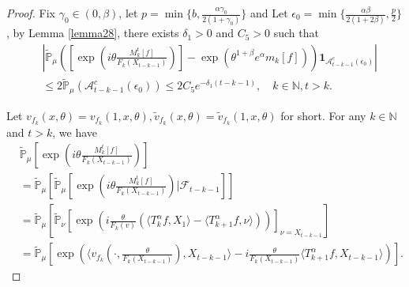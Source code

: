 \documentclass[12pt,oneside,english]{amsart}
\theoremstyle{plain}
\theoremstyle{definition}
\numberwithin{equation}{section}
\begin{document}
\begin{proof}
Fix $\gamma_0\in (0,\beta)$, let $p=\min\{b,\frac{\alpha\gamma_0}{2(1+\gamma_0)}\}$ and Let $\epsilon_0=\min\{\frac{\alpha\beta}{2(1+2\beta)},\frac{p}{2}\}$, by Lemma \ref{lemma28}, there exists $\delta_1>0$ and $C_5>0$ such that 
    \begin{align}
    \label{eq:31step0}
        &\left|\mathbb{\tilde{P}}_{\mu}\left([\exp(i\theta \frac {M_k^t[f]}{F_k(X_{t-k-1})})]-\exp(\theta^{1+\beta}e^{\alpha}m_k[f])\right)\mathbf{1}_{\mathcal{A}^c_{t-k-1}(\epsilon_0)}\right|
        \\ &\leq 2\mathbb{\tilde{P}}_{\mu}(\mathcal{A}^c_{t-k-1}(\epsilon_0))
        \leq 2C_5e^{-\delta_1(t-k-1)},\quad k\in \mathbb{N}, t>k.\label{lemma33q}
    \end{align}
    

    Let $v_{f_k}(x,\theta)=v_{f_k}(1,x,\theta),\tilde{v}_{f_k}(x,\theta)=\tilde{v}_{f_k}(1,x,\theta)$ for short. For any $k\in\mathbb{N}$ and $t>k$, we have
    \begin{align*}
        &\mathbb{\tilde{P}}_{\mu}[\exp(i\theta\frac {M_k^t[f]}{F_k(X_{t-k-1})})]\\
        &=\mathbb{\tilde{P}}_{\mu}\left[\mathbb{\tilde{P}}_{\mu}[\exp(i\theta\frac{M_k^t[f]}{F_k(X_{t-k-1})})|\mathcal{F}_{t-k-1}]\right]\\
        &=\mathbb{\tilde{P}}_{\mu}\left[\mathbb{\tilde{P}}_{\nu}\left[\exp\left(i\frac{\theta}{F_k(v)}(\langle T_k^{\alpha}f,X_1\rangle-\langle T_{k+1}^{\alpha}f,\nu\rangle)\right)\right]_{\nu=X_{t-k-1}}\right]\\
        &=\mathbb{\tilde{P}}_{\mu}\left[\exp\left(\langle v_{f_k}(\cdot,\frac{\theta}{F_k(X_{t-k-1})}),X_{t-k-1}\rangle-i\frac{\theta}{F_k(X_{t-k-1})}\langle T_{k+1}^{\alpha}f, X_{t-k-1}\rangle\right)\right].
    \end{align*}


\end{proof}
\end{document}

